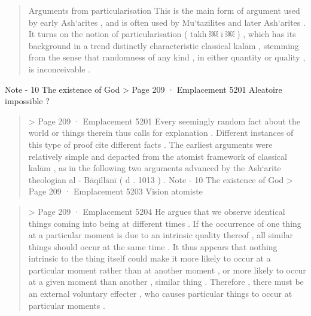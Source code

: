 \begin{quote}
Arguments from particularisation This is the main form of argument used by early Ash‘arites , and is often used by Mu‘tazilites and later Ash‘arites . It turns on the notion of particularisation ( takh ￼ ī ￼ ) , which has its background in a trend distinctly characteristic
classical kalām , stemming from the sense that randomness of any kind , in either quantity or quality , is inconceivable .
\end{quote} 
\begin{Synthesis}
Note - 10 The existence of God > Page 209 · Emplacement 5201
Aleatoire impossible ?
\end{Synthesis}
\begin{quote} > Page 209 · Emplacement 5201
Every seemingly random fact about the world or things therein thus calls for explanation . Different instances of this type of proof cite different facts . The earliest arguments were relatively simple and departed from the atomist framework of classical kalām , as in the following two arguments advanced by the Ash‘arite theologian al - Bāqillānī ( d . 1013 ) .
Note - 10 The existence of God > Page 209 · Emplacement 5203
Vision atomiste
\end{quote} \begin{quote} > Page 209 · Emplacement 5204
He argues that we observe identical things coming into being at different times . If the occurrence of one thing at a particular moment is due to an intrinsic quality thereof , all similar things should occur at the same time . It thus appears that nothing intrinsic to the thing itself could make it more likely to occur at a particular moment rather than at another moment , or more likely to occur at a given moment than another , similar thing . Therefore , there must be an external voluntary effecter , who causes particular things to occur at particular moments .
\end{quote} 

